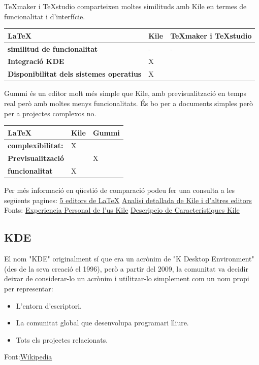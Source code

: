 TeXmaker i TeXstudio comparteixen moltes similituds amb Kile en termes de funcionalitat i d'interfície. \\

\begin{table}[h!]
 \begin{tabular}{|l|l|l|}
\hline
 \LaTeX & \textbf{Kile} & \textbf{TeXmaker i TeXstudio} \\ \hline
 \textbf{similitud de funcionalitat} & - & - \\ \hline
 \textbf{Integració KDE} & X & \\ \hline
 \textbf{Disponibilitat dels sistemes operatius} & X &  \\ \hline
 \end{tabular}
\end{table}

Gummi és un editor molt més simple que Kile, amb previsualització en temps real però amb moltes menys funcionalitats. És bo per a documents simples però per a projectes complexos no. \\
\begin{table}[h!]
 \begin{tabular}{|l|l|l|}
\hline
 \LaTeX & \textbf{Kile} & \textbf{Gummi} \\ \hline
 \textbf{complexibilitat:}  & X &  \\ \hline
 \textbf{Previsualització} &  & X \\ \hline
 \textbf{funcionalitat} & X &  \\ \hline
 \end{tabular}
\end{table}

Per més informació en qüestió de comparació podeu fer una consulta a les següents pagines: \href{https://osluca.uca.es/noticia/cinco-editores-de-latex-libres/}{5 editors de LaTeX} \href{https://latex.org/forum/viewtopic.php?t=208}{Analisí detallada de Kile i d'altres editors}
Fonts: \href{https://iloo.wordpress.com/2010/10/20/kile-otro-editor-latex/}{Experiencia Personal de l'us Kile} \href{https://www.kdeblog.com/editor-de-latex-para-kde-kile.html}{Descripcio de Característiques Kile}

\subsection{KDE}\label{subsec:KDE}
El nom "KDE" originalment sí que era un acrònim de "K Desktop Environment" (des de la seva creació el 1996), però a partir del 2009, la comunitat va decidir deixar de considerar-lo un acrònim i utilitzar-lo simplement com un nom propi per representar:
\begin{itemize}
 \item L'entorn d'escriptori.
 \item La comunitat global que desenvolupa programari lliure.
 \item Tots els projectes relacionats.
\end{itemize}
Font:\href{https://ca.wikipedia.org/wiki/KDE}{Wikipedia}

